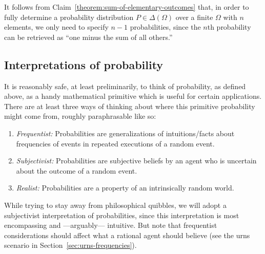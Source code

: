 \documentclass[nobib,nofonts]{tufte-handout}
\renewcommand{\markdef}[1]{\emph{#1}}
\begin{document}
It follows from Claim~\ref{theorem:sum-of-elementary-outcomes} that, in order to fully determine a probability distribution $P \in \Delta(\Omega)$ over a finite $\Omega$ with $n$ elements, we only need to specify $n-1$ probabilities, since the $n$th probability can be retrieved as ``one minus the sum of all others.''

\subsection{Interpretations of probability}

It is reasonably safe, at least preliminarily, to think of probability, as defined above, as a
handy mathematical primitive which is useful for certain applications. There are at least three
ways of thinking about where this primitive probability might come from, roughly paraphrasable
like so:
\begin{enumerate}[1.]
\item \markdef{Frequentist:} Probabilities are generalizations of intuitions/facts about frequencies of events in
  repeated executions of a random event.
\item \markdef{Subjectivist:} Probabilities are subjective beliefs by an agent who is
  uncertain about the outcome of a random event.
\item \markdef{Realist:} Probabilities are a property of an intrinsically random world.
\end{enumerate}

While trying to stay away from philosophical quibbles, we will adopt a subjectivist interpretation of probabilities, since this interpretation is most encompassing and ---arguably--- intuitive.
But note that frequentist considerations should affect what a rational agent should believe (see the urns scenario in Section~\ref{sec:urns-frequencies}).
\end{document}
